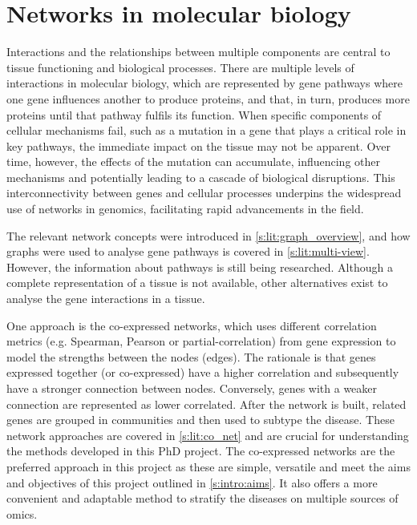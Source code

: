 \section{Networks in molecular biology} \label{s:lit:nets_bio}

\vspace{3mm}
\vspace{3mm}

Interactions and the relationships between multiple components are central to tissue functioning and biological processes. There are multiple levels of interactions in molecular biology, which are represented by gene pathways where one gene influences another to produce proteins, and that, in turn, produces more proteins until that pathway fulfils its function. When specific components of cellular mechanisms fail, such as a mutation in a gene that plays a critical role in key pathways, the immediate impact on the tissue may not be apparent. Over time, however, the effects of the mutation can accumulate, influencing other mechanisms and potentially leading to a cascade of biological disruptions. This interconnectivity between genes and cellular processes underpins the widespread use of networks in genomics, facilitating rapid advancements in the field.

The relevant network concepts were introduced in \cref{s:lit:graph_overview}, and how graphs were used to analyse gene pathways is covered in \cref{s:lit:multi-view}. However, the information about pathways is still being researched. Although a complete representation of a tissue is not available, other alternatives exist to analyse the gene interactions in a tissue.

One approach is the co-expressed networks, which uses different correlation metrics (e.g. Spearman, Pearson or partial-correlation) from gene expression to model the strengths between the nodes (edges). The rationale is that genes expressed together (or co-expressed) have a higher correlation and subsequently have a stronger connection between nodes. Conversely, genes with a weaker connection are represented as lower correlated. After the network is built, related genes are grouped in communities and then used to subtype the disease. These network approaches are covered in \cref{s:lit:co_net} and are crucial for understanding the methods developed in this PhD project. The co-expressed networks are the preferred approach in this project as these are simple, versatile and meet the aims and objectives of this project outlined in \cref{s:intro:aims}. It also offers a more convenient and adaptable method to stratify the diseases on multiple sources of omics.

